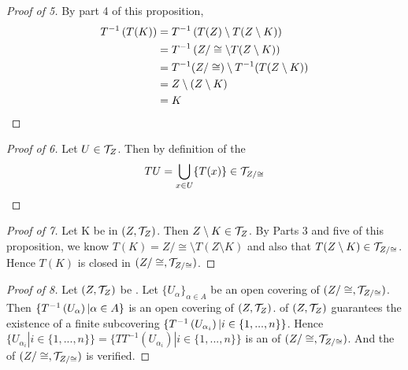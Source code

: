 \begin{prop}
\begin{proof}[Proof of 5]
        By part 4 of this proposition, 
        \begin{align*}
            T^{-1}\left( T(K)\right)&=T^{-1} \left( T(Z) \setminus T(Z \setminus K)\right) \\
            &= T^{-1}\left( Z/\cong \setminus T(Z \setminus K)\right)\\
            &=T^{-1}(Z/\cong) \setminus T^{-1}(T(Z\setminus K)) \\
            &= Z \setminus \left( Z \setminus K\right) \\
            &= K
        \end{align*}      
    \end{proof}
    \begin{proof}[Proof of 6]
        Let $U \in \mathcal{T}_Z$.
        Then by definition of the \QuotientSpaceTopology
        \begin{equation}
            TU= \bigcup_{x \in U} \{T(x)\}  \in \mathcal{T}_{Z/\cong}
        \end{equation}
    \end{proof}  
    \begin{proof}[Proof of 7] 
        Let K be \SetClosed in $(Z,\mathcal{T}_Z)$. 
        Then $Z \setminus K \in \mathcal{T}_Z$. 
        By Parts 3 and five of this proposition, we know $T(K) = Z/\cong \setminus T(Z\setminus K)$ and also that $T(Z\setminus K) \in \mathcal{T}_{Z/\cong}$. Hence $T(K)$ is closed in $(Z/\cong, \mathcal{T}_{Z/\cong})$. 
    \end{proof} 
    \begin{proof}[Proof of 8]
        Let $(Z,\mathcal{T}_Z)$ be \SetCompact. 
        Let $\{U_{\alpha}\}_{\alpha \in A}$ be an open covering of $(Z/\cong, \mathcal{T}_{Z/\cong})$. 
        Then $\{T^{-1}\left( U_{\alpha}\right) | \alpha \in A\}$ is an open covering of $(Z, \mathcal{T}_Z)$. 
        \SetCompactness of $(Z, \mathcal{T}_Z)$ guarantees the existence of a finite subcovering $\{T^{-1}\left( U_{\alpha_i}\right) | i \in \{1, ..., n\}\}$. 
        Hence
        $\{U_{\alpha_i} | i \in \{1, ..., n\}\}=\{TT^{-1}(U_{\alpha_i}) | i \in \{1, ..., n\}\}$ is an 
		\SetOpen
        \Cover of $(Z/\cong, \mathcal{T}_{Z/\cong})$. 
         And the \SetCompactness of $(Z/\cong, \mathcal{T}_{Z/\cong})$ is verified. 
         

\end{proof}
\end{prop}
